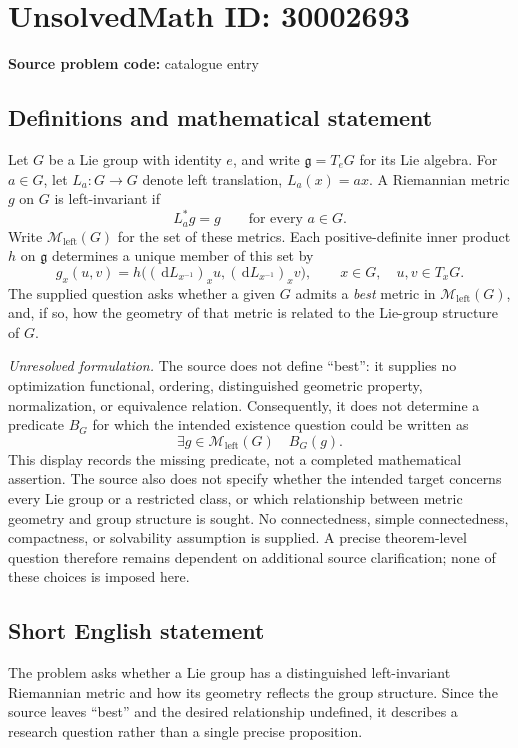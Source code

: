 \documentclass[11pt]{article}
\newcommand{\dd}{\,\mathrm{d}}
\begin{document}
\section*{UnsolvedMath ID: 30002693}
\textbf{Source problem code:} catalogue entry
\subsection{Definitions and mathematical statement}
Let \(G\) be a Lie group with identity \(e\), and write \(\mathfrak g=T_eG\) for its Lie algebra. For \(a\in G\), let \(L_a:G\to G\) denote left translation, \(L_a(x)=ax\). A Riemannian metric \(g\) on \(G\) is left-invariant if
\[
L_a^*g=g\qquad\text{for every }a\in G.
\]
Write \(\mathcal M_{\mathrm{left}}(G)\) for the set of these metrics. Each positive-definite inner product \(h\) on \(\mathfrak g\) determines a unique member of this set by
\[
g_x(u,v)=h\bigl((\dd L_{x^{-1}})_x u,(\dd L_{x^{-1}})_x v\bigr),
\qquad x\in G,\quad u,v\in T_xG.
\]
The supplied question asks whether a given \(G\) admits a \emph{best} metric in \(\mathcal M_{\mathrm{left}}(G)\), and, if so, how the geometry of that metric is related to the Lie-group structure of \(G\).

\emph{Unresolved formulation.} The source does not define ``best'': it supplies no optimization functional, ordering, distinguished geometric property, normalization, or equivalence relation. Consequently, it does not determine a predicate \(B_G\) for which the intended existence question could be written as
\[
\exists g\in\mathcal M_{\mathrm{left}}(G)\quad B_G(g).
\]
This display records the missing predicate, not a completed mathematical assertion. The source also does not specify whether the intended target concerns every Lie group or a restricted class, or which relationship between metric geometry and group structure is sought. No connectedness, simple connectedness, compactness, or solvability assumption is supplied. A precise theorem-level question therefore remains dependent on additional source clarification; none of these choices is imposed here.
\subsection{Short English statement}
The problem asks whether a Lie group has a distinguished left-invariant Riemannian metric and how its geometry reflects the group structure. Since the source leaves ``best'' and the desired relationship undefined, it describes a research question rather than a single precise proposition.
\end{document}
